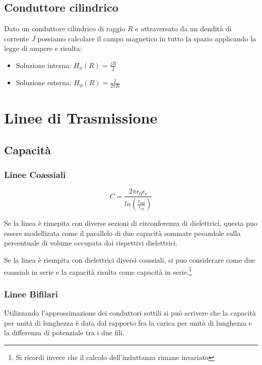 \documentclass[10pt,a4paper]{report}
\begin{document}
	\section{Conduttore cilindrico}
		Dato un conduttore cilindrico di raggio $R$ e attraversato da un dendità di corrente $J$ possiamo calcolare il campo magnetico in tutto la spazio applicando la legge di ampere e risulta:

		\begin{itemize}
		\item Soluzione interna: $H_\phi(R)=\frac{jR}{2}$ 
		\item Soluzione esterna: $H_\phi(R)=\frac{I}{2\pi R}$

		\end{itemize}

\chapter{Linee di Trasmissione}

	\section{Capacità}

	
		\subsection{Linee Coassiali}
				\begin{equation}
				C=\frac{2\pi \epsilon_0 \epsilon_r} {ln (\frac { r_{out}} {r_{in} } )}
				\end{equation}

				Se la linea è rimepita con diverse sezioni di circonferenza di dielettrici, questa puo essere modellizata come il parallelo di due capacità sommate pesandole sulla percentuale di volume occupata dai rispettivi dielettrici.
			
				Se la linea è riempita con dielettrici diversi coassiali, si puo considerare come due coassiali in serie e la capacità risulta come capacità in serie.\footnote{Si ricordi invece che il calcolo dell'induttanza rimane invariato}


		\subsection{Linee Bifilari}

			Utilizzando l'approssimazione dei conduttori sottili si può scrivere che la capacità per unità di lunghezza è data dal rapporto fra la carica per unità di lunghezza e la 
			differenza di potenziale tra i due fili.
			
\end{document}

